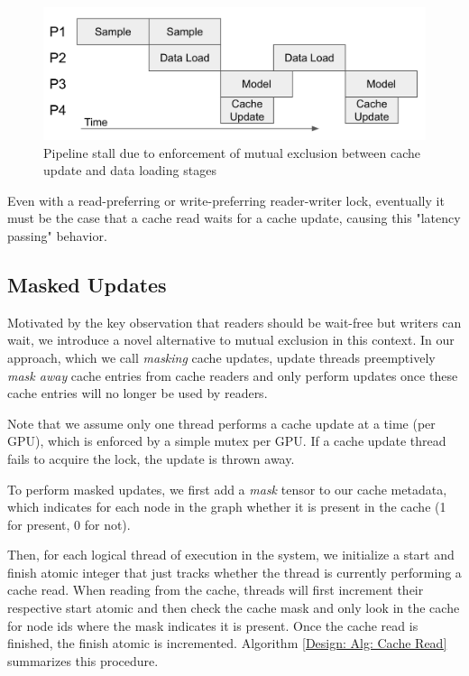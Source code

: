 \begin{figure}[h!]
    \centering
    \includegraphics[width=\textwidth]{figures/Pipeline with lock.png}
    \caption{Pipeline stall due to enforcement of mutual exclusion between cache update and data loading stages}
    \label{Impl: Contended pipeline}
\end{figure}    

Even with a read-preferring or write-preferring reader-writer lock, eventually it must be the case that a cache read waits for a cache update, causing this "latency passing" behavior.  

\subsection{Masked Updates}
Motivated by the key observation that readers should be wait-free but writers can wait, we introduce a novel alternative to mutual exclusion in this context. In our approach, which we call \textit{masking} cache updates, update threads preemptively \textit{mask away} cache entries from cache readers and only perform updates once these cache entries will no longer be used by readers. 

Note that we assume only one thread performs a cache update at a time (per GPU), which is enforced by a simple mutex per GPU. If a cache update thread fails to acquire the lock, the update is thrown away.

To perform masked updates, we first add a \textit{mask} tensor to our cache metadata, which indicates for each node in the graph whether it is present in the cache (1 for present, 0 for not).

Then, for each logical thread of execution in the system, we initialize a start and finish atomic integer that just tracks whether the thread is currently performing a cache read.
When reading from the cache, threads will first increment their respective start atomic and then check the cache mask and only look in the cache for node ids where the mask indicates it is present.
Once the cache read is finished, the finish atomic is incremented.
Algorithm \ref{Design: Alg: Cache Read} summarizes this procedure.

